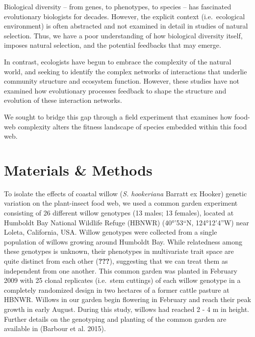 \documentclass[]{elsarticle} %
\begin{document}
Biological diversity -- from genes, to phenotypes, to species -- has
fascinated evolutionary biologists for decades. However, the explicit
context (i.e.~ecological environment) is often abstracted and not
examined in detail in studies of natural selection. Thus, we have a poor
understanding of how biological diversity itself, imposes natural
selection, and the potential feedbacks that may emerge.

In contrast, ecologists have begun to embrace the complexity of the
natural world, and seeking to identify the complex networks of
interactions that underlie community structure and ecosystem function.
However, these studies have not examined how evolutionary processes
feedback to shape the structure and evolution of these interaction
networks.

We sought to bridge this gap through a field experiment that examines
how food-web complexity alters the fitness landscape of species embedded
within this food web.

\section{Materials \& Methods}\label{materials-methods}

To isolate the effects of coastal willow (\textit{S. hookeriana} Barratt
ex Hooker) genetic variation on the plant-insect food web, we used a
common garden experiment consisting of 26 different willow genotypes (13
males; 13 females), located at Humboldt Bay National Wildlife Refuge
(HBNWR) (40°'53``N, 124°12'4''W) near Loleta, California, USA. Willow
genotypes were collected from a single population of willows growing
around Humboldt Bay. While relatedness among these genotypes is unknown,
their phenotypes in multivariate trait space are quite distinct from
each other ({\textbf{???}}), suggesting that we can treat them as
independent from one another. This common garden was planted in February
2009 with 25 clonal replicates (i.e.~stem cuttings) of each willow
genotype in a completely randomized design in two hectares of a former
cattle pasture at HBNWR. Willows in our garden begin flowering in
February and reach their peak growth in early August. During this study,
willows had reached 2 - 4 m in height. Further details on the genotyping
and planting of the common garden are available in (Barbour et al.
2015).
\end{document}

